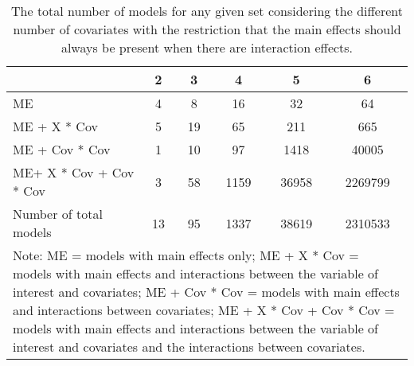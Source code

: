\begin{table}[!h]
\centering
\caption{The total number of models for any given set considering the different number of covariates with the restriction that the main effects should always be present when there are interaction effects.} 
\begin{tabular}{lccccc}
  \hline
 & 2 & 3 & 4 & 5 & 6 \\ 
  \hline
ME & 4 & 8 & 16 & 32 & 64 \\ 
  ME + X * Cov & 5 & 19 & 65 & 211 & 665 \\ 
  ME + Cov * Cov & 1 & 10 & 97 & 1418 & 40005 \\ 
  ME+ X * Cov + Cov * Cov & 3 & 58 & 1159 & 36958 & 2269799 \\ 
  Number of total models & 13 & 95 & 1337 & 38619 & 2310533 \\ 
   \hline 
\multicolumn{6}{p{12cm}}{\footnotesize{Note: ME = models with main effects only; ME + X * Cov = models with main effects and interactions between the variable of interest and covariates; ME + Cov * Cov = models with main effects and interactions between covariates; ME + X * Cov + Cov * Cov = models with main effects and interactions between the variable of interest and covariates and the interactions between covariates.}} 
\end{tabular}
\end{table}
